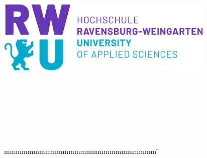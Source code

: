 
\begin{titlepage}
	\includegraphics[height=3.5cm]{images/rwu_logo_hor-lila-cyan_rgb.png}
	\enlargethispage{20mm}
	\begin{center}
		\vspace*{12mm}	{\LARGE\textbf \titel }\\
		\vspace*{12mm}
		\vspace*{12mm}	{\large\textbf \arbeit}\\
		\vspace*{12mm}
    \vspace*{3mm}		\langanderdh{} \dhbw\\
		\vspace*{12mm}	\langvon\\
		\vspace*{3mm}		{\large\textbf \autor}\\
		\vspace*{12mm}	\datumAbgabe\\
	\end{center}
	\vfill
	\begin{spacing}{1.2}
	\begin{tabbing}
		mmmmmmmmmmmmmmmmmmmmmmmmmm             \= \kill
		\textbf{\langdbmatriknr}  \>  \martrikelnr\\
		\textbf{\langdbbetreuer}               \>  \betreuer\\
		\textbf{\langdbgutachter}              \>  \gutachter
	\end{tabbing}
	\end{spacing}
\end{titlepage}
